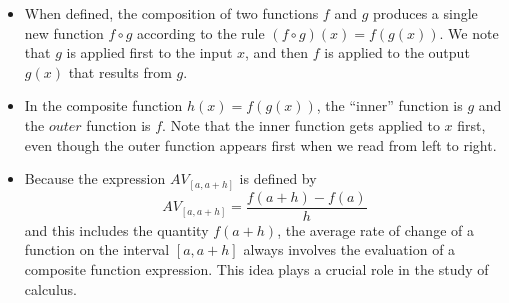 \documentclass{ximera}
\begin{document}

\begin{summary}\begin{itemize}
\item When defined, the composition of two functions \(f\) and \(g\) produces a single new function \(f \circ g\) according to the rule \((f \circ g)(x) = f(g(x))\).  We note that \(g\) is applied first to the input \(x\), and then \(f\) is applied to the output \(g(x)\) that results from \(g\).
\item In the composite function \(h(x) = f(g(x))\), the ``inner'' function is \(g\) and the \(outer\) function is \(f\).  Note that the inner function gets applied to \(x\) first, even though the outer function appears first when we read from left to right. 
\item Because the expression \(AV_{[a,a+h]}\) is defined by%
\begin{equation*}
AV_{[a,a+h]} = \frac{f(a+h) - f(a)}{h} 
\end{equation*}
and this includes the quantity \(f(a+h)\), the average rate of change of a function on the interval \([a,a+h]\) always involves the evaluation of a composite function expression.  This idea plays a crucial role in the study of calculus.
\end{itemize}\end{summary}
\end{document}
